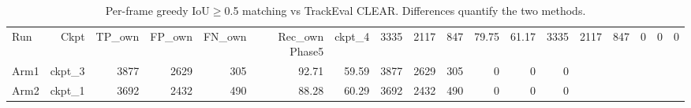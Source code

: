\begin{table}[ht]
\centering
\caption{Per-frame greedy IoU$\geq$0.5 matching vs TrackEval CLEAR. Differences quantify the two methods.}
\label{tab:detection_outcomes}
\begin{tabular}{lrrrrrrrrrrrr}
\toprule
Run & Ckpt & TP_own & FP_own & FN_own & Rec_own%
\midrule
Phase5 & ckpt_4 & 3335 & 2117 & 847 & 79.75 & 61.17 & 3335 & 2117 & 847 & 0 & 0 & 0 \\
Arm1 & ckpt_3 & 3877 & 2629 & 305 & 92.71 & 59.59 & 3877 & 2629 & 305 & 0 & 0 & 0 \\
Arm2 & ckpt_1 & 3692 & 2432 & 490 & 88.28 & 60.29 & 3692 & 2432 & 490 & 0 & 0 & 0 \\
\bottomrule
\end{tabular}
\end{table}
